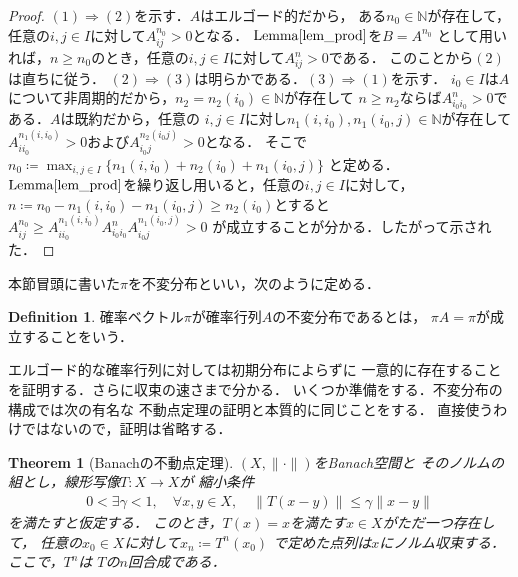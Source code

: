 \documentclass[dvipdfmx,autodetect-engine]{jsarticle}
\newtheorem{theorem}{Theorem}[section]
\theoremstyle{remark}
\theoremstyle{definition}
\newtheorem{definition}{Definition}[section]
\newcommand{\N}{\mathbb{N}}
\begin{document}
\begin{proof}
    $(1)\Rightarrow (2)$を示す．$A$はエルゴード的だから，
    ある$n_0 \in \N$が存在して，任意の$i,j \in I$に対して$A_{ij}^{n_0}>0$となる．
    $\mathrm{Lemma}\ref{lem_prod}$を$B = A^{n_0}$
    として用いれば，$n \geq n_0$のとき，任意の$i,j \in I$に対して$A_{ij}^n >0$である．
    このことから$(2)$は直ちに従う．
    $(2)\Rightarrow (3)$は明らかである．$(3) \Rightarrow (1)$を示す．
    $i_0 \in I$は$A$について非周期的だから，$n_2 = n_2(i_0) \in \N$が存在して
    $n \geq n_2$ならば$A_{i_{0} i_{0}}^{n}>0$である．$A$は既約だから，任意の
    $i,j \in I$に対し$n_1(i,i_0),n_1(i_0,j) \in \N$が存在して
    $A_{i i_0}^{n_1(i,i_0)} > 0$および$A_{i_0 j}^{n_2(i_0 j)}>0$となる．
    そこで$n_0 \coloneqq \max_{i,j \in I} \{n_1(i,i_0) + n_2(i_0) + n_1(i_0,j)\}$
    と定める．$\mathrm{Lemma}\ref{lem_prod}$を繰り返し用いると，任意の$i,j \in I$に対して，
    $n \coloneqq n_0 - n_1(i,i_0) - n_1(i_0,j) \geq n_2(i_0)$とすると
    $A_{ij}^{n_0} \geq A_{i i_0}^{n_1(i,i_0)} A_{i_0 i_0}^{n} A_{i_0 j}^{n_1(i_0,j)}>0$
    が成立することが分かる．したがって示された．
\end{proof}


本節冒頭に書いた$\pi$を不変分布といい，次のように定める．


\begin{definition}
    確率ベクトル$\pi$が確率行列$A$の不変分布であるとは，
    $\pi A = \pi$が成立することをいう．
\end{definition}


エルゴード的な確率行列に対しては初期分布によらずに
一意的に存在することを証明する．さらに収束の速さまで分かる．
いくつか準備をする．不変分布の構成では次の有名な
不動点定理の証明と本質的に同じことをする．
直接使うわけではないので，証明は省略する．


\begin{theorem}[Banachの不動点定理]\label{Banach_contraction}
    $(X, \lVert \cdot \rVert)$をBanach空間と
    そのノルムの組とし，線形写像$T \colon X \to X$が
    縮小条件
    \begin{align}
        0 < \exists \gamma < 1,\quad \forall x,y \in X,\quad 
        \lVert T(x-y)\rVert \leq \gamma \lVert x-y \rVert
    \end{align}
    を満たすと仮定する．
    このとき，$T(x) = x$を満たす$x \in X$がただ一つ存在して，
    任意の$x_0 \in X$に対して$x_n \coloneqq T^n (x_0)$
    で定めた点列は$x$にノルム収束する．ここで，$T^n$は
    $T$の$n$回合成である．
\end{theorem}
\end{document}
